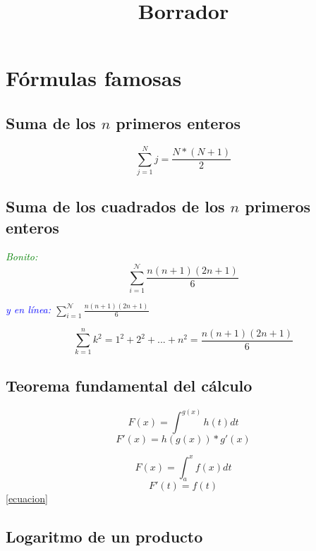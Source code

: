 \documentclass{article}
\author{}
\date{}
\title{Borrador}
\begin{document}
\maketitle


\begin{abstract}

\end{abstract}

\section{F\'ormulas famosas}

\subsection{Suma de los $n$ primeros enteros}

\[\sum_{j=1}^{N}j=\frac{N*(N+1)}{2}\]


\subsection{Suma de los cuadrados de los $n$ primeros enteros}



\textit{\textcolor{green}{{\large B}{\small onito:}}} \[ \sum_{i=1}^\mathcal{N} \frac{n(n+1)(2n+1)}{6} \]

\textit{\textcolor{blue}{y en línea: }}$\sum_{i=1}^\mathcal{N} \frac{n(n+1)(2n+1)}{6} $

\[ \sum_{k=1}^n k^2 = 1^2 + 2^2 + ... + n^2 = \frac{n(n+1)(2n+1)}{6}\]

\subsection{Teorema fundamental del cálculo}


\begin{equation} F(x)=\int^{g(x)} h(t) dt \end{equation}
\begin{equation} F'(x)=h(g(x))*g'(x) \label{ecuacion}\end{equation}


\[F(x) = \int_a^xf(x)dt\]
\[F'(t)=f(t)\]
\ref{ecuacion}

\subsection{Logaritmo de un producto}
\end{document}
